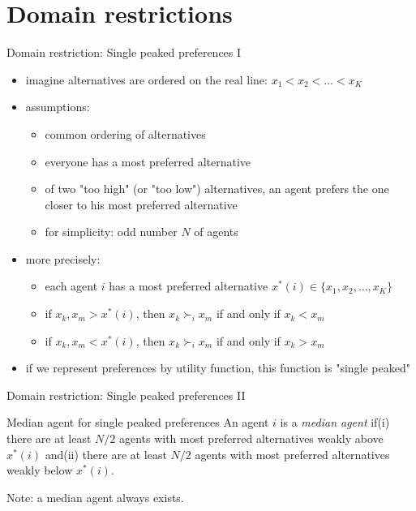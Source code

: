 \documentclass[bigger]{beamer}
\begin{document}
\section{Domain restrictions}
\label{sec:org2cf6683}
\begin{frame}[label={sec:org10db029}]{Domain restriction: Single peaked preferences I}
\begin{itemize}
\item imagine alternatives are ordered on the real line: \(x_1<x_2<\dots <x_K\)
\item assumptions:
\begin{itemize}
\item common ordering of alternatives
\item everyone has a most preferred alternative
\item of two "too high" (or "too low") alternatives, an agent prefers the one closer to his most preferred alternative
\item for simplicity: odd number \(N\) of agents
\end{itemize}

\item more precisely:
\begin{itemize}
\item each agent \(i\) has a most preferred alternative \(x^*(i)\in\{x_1,x_2,\dots,x_K\}\)
\item if \(x_k,x_m>x^*(i)\), then \(x_k\succ_i x_m\) if and only if \(x_k<x_m\)
\item if \(x_k,x_m<x^*(i)\), then \(x_k\succ_i x_m\) if and only if \(x_k>x_m\)
\end{itemize}
\item if we represent preferences by utility function, this function is "single peaked"
\end{itemize}
\end{frame}
\begin{frame}[label={sec:org9a0fe86}]{Domain restriction: Single peaked preferences II}
\begin{block}{Median agent for single peaked preferences}
An agent \(i\) is a \emph{median agent} if\linebreak (i) there are at least \(N/2\) agents with most preferred alternatives weakly above \(x^*(i)\) and\linebreak (ii) there are at least \(N/2\) agents with most preferred alternatives weakly below \(x^*(i)\).
\end{block}
Note: a median agent always exists.
\end{frame}
\end{document}

